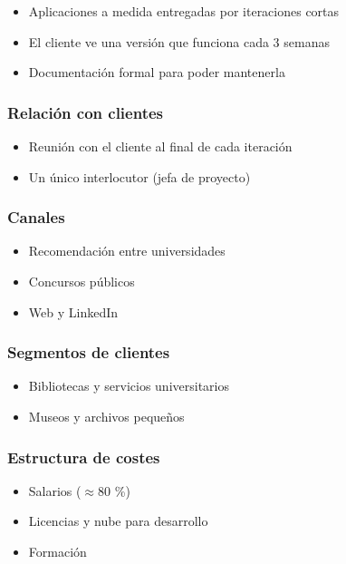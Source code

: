 \begin{itemize}
\item Aplicaciones a medida entregadas por iteraciones cortas
\item El cliente ve una versión que funciona cada 3 semanas
\item Documentación formal para poder mantenerla
\end{itemize}

\subsubsection*{Relación con clientes}

\begin{itemize}
\item Reunión con el cliente al final de cada iteración
\item Un único interlocutor (jefa de proyecto)
\end{itemize}

\subsubsection*{Canales}

\begin{itemize}
\item Recomendación entre universidades
\item Concursos públicos
\item Web y LinkedIn
\end{itemize}

\subsubsection*{Segmentos de clientes}

\begin{itemize}
\item Bibliotecas y servicios universitarios
\item Museos y archivos pequeños
\end{itemize}

\subsubsection*{Estructura de costes}

\begin{itemize}
\item Salarios ($\approx$80 \%)
\item Licencias y nube para desarrollo
\item Formación
\end{itemize}

